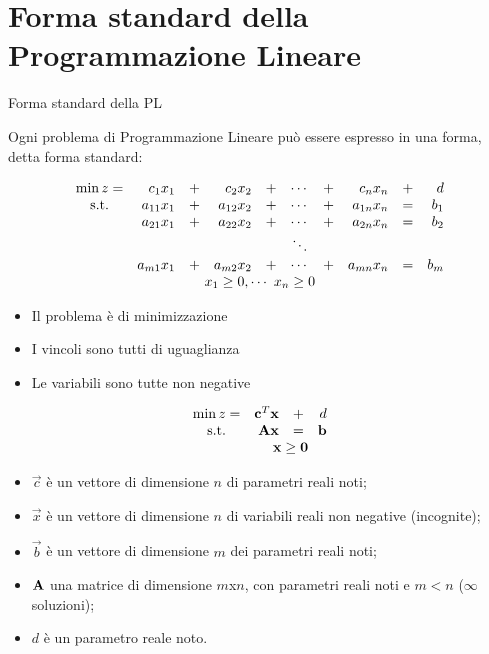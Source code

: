\documentclass{beamer}
\begin{document}
\generatitolo

\section{Forma standard della Programmazione Lineare}

\begin{frame}[allowframebreaks]{Forma standard della PL}

{\scriptsize Ogni problema di Programmazione Lineare pu\`o essere espresso in una forma, detta \alert{forma standard}:

\vspace*{0.4cm}

{\[
\begin{array}{crrrcccrcr}
\min z=& c_1 x_1 &+& c_2 x_2    &+&\cdots&+& c_n x_n &+& d\\
{\rm s.t.} & a_{11} x_1 &+& a_{12} x_2 &+&\cdots&+& a_{1n} x_n & = & b_1\\
                & a_{21} x_1 &+& a_{22} x_2 &+&\cdots&+& a_{2n} x_n & = & b_2\\
           &          & &           &  &\ddots&   &                   \\
           &  a_{m1} x_1 &+&  a_{m2} x_2 &+&\cdots&+& a_{mn} x_n & = & b_m\\
           \multicolumn{10}{c}{x_1 \geq 0,\cdots\ x_n \geq 0} 
\end{array}
\]}
}

\framebreak

\begin{itemize}
\item Il problema \`e di minimizzazione 
\item I vincoli sono tutti di uguaglianza 
\item Le variabili sono tutte non negative 
\end{itemize}


{\[
\begin{array}{crrr}
\min z=& \vec{c}^T \vec{x} &+& d \\
{\rm s.t.} & \matr{A} \vec{x} & =& \vec{b} \\
&\multicolumn{3}{c}{\vec{x} \geq \vec{0}} 
\end{array}
\]}

\framebreak

\begin{itemize}
\item    $\vec{c}$ \`e un vettore di dimensione $n$ di parametri reali noti;
\item     $\vec{x}$ \`e un vettore di dimensione $n$ di variabili reali non negative (incognite);
\item     $\vec{b}$ \`e un vettore di dimensione $m$ dei parametri reali noti;
\item     $\mathbf{A}$ una matrice di dimensione $m$x$n$, con parametri reali noti e $m < n$ ($\infty$ soluzioni);
\item     $d$ \`e un parametro reale noto.
\end{itemize}


\end{frame}
\end{document}
